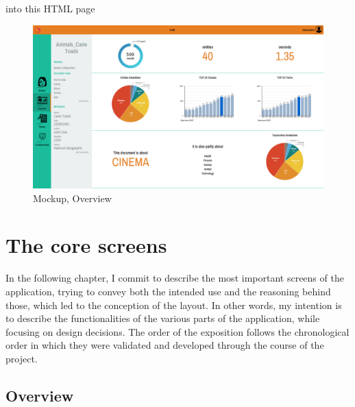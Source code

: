 \documentclass[12pt,svgnames]{memoir}
\begin{document}
into this HTML page

\begin{figure}[htbp]
\centering
\includegraphics{./src/img/mockup-overview.png}
\caption{Mockup, Overview}
\end{figure}

\chapter{The core screens}\label{the-core-screens}

In the following chapter, I commit to describe the most important
screens of the application, trying to convey both the intended use and
the reasoning behind those, which led to the conception of the layout.
In other words, my intention is to describe the functionalities of the
various parts of the application, while focusing on design decisions.
The order of the exposition follows the chronological order in which
they were validated and developed through the course of the project.

\section{Overview}\label{overview-1}
\end{document}
